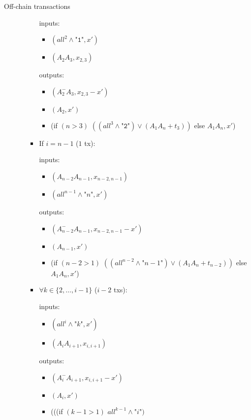 \begin{notitlebox}{Off-chain transactions}
\begin{itemize}
\begin{itemize}
\begin{itemize}
        inputs:
        \begin{itemize}
          \item $(\mathit{all}^2 \wedge \texttt{"1"}, x')$
          \item $(A_2 A_3, x_{2,3})$
        \end{itemize}
        outputs:
        \begin{itemize}
          \item $(A_2^- A_3, x_{2,3} - x')$
          \item $(A_2, x')$
          \item (if $(n > 3)$ $((\mathit{all}^{3} \wedge \texttt{"2"}) \vee
          (A_1 A_n + t_3))$ else $A_1 A_n, x'$)
        \end{itemize}
        \item If $i = n-1$ ($1$ tx):

        inputs:
        \begin{itemize}
          \item $(A_{n-2} A_{n-1}, x_{n-2,n-1})$
          \item $(\mathit{all}^{n-1} \wedge \texttt{"}n\texttt{"}, x')$
        \end{itemize}
        outputs:
        \begin{itemize}
          \item $(A_{n-2}^- A_{n-1}, x_{n-2,n-1} - x')$
          \item $(A_{n-1}, x')$
          \item (if $(n-2 > 1)$ $((\mathit{all}^{n-2} \wedge
          \texttt{"}n-1\texttt{"})
          \vee (A_1 A_n + t_{n-2}))$ else $A_1 A_n, x'$)
        \end{itemize}
        \item $\forall k \in \{2, \dots, i-1\}$ ($i-2$ txs):

        inputs:
        \begin{itemize}
          \item $(\mathit{all}^i \wedge \texttt{"}k\texttt{"}, x')$
          \item $(A_i A_{i+1}, x_{i,i+1})$
        \end{itemize}
        outputs:
        \begin{itemize}
          \item $(A_i^- A_{i+1}, x_{i,i+1} - x')$
          \item $(A_i, x')$
          \item (((if $(k-1 > 1)$ $\mathit{all}^{k-1} \wedge
          \texttt{"}i\texttt{"})$


\end{itemize}
\end{itemize}
\end{itemize}
\end{itemize}
\end{notitlebox}
